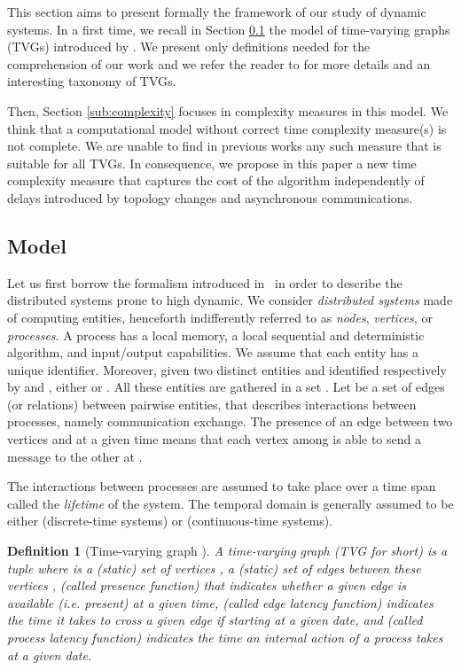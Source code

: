 \documentclass{article}
\newtheorem{definition}{Definition}
\begin{document}
This section aims to present formally the framework of our study of dynamic systems. In a first time, we recall in Section \ref{sub:model} the model of time-varying graphs (TVGs) introduced by \cite{CFQS12}. We present only definitions needed for the comprehension of our work and we refer the reader to \cite{CFQS12} for more details and an interesting taxonomy of TVGs. 

Then, Section \ref{sub:complexity} focuses in complexity measures in this model. We think that a computational model without correct time complexity measure(s) is not complete. We are unable to find in previous works any such measure that is suitable for all TVGs. In consequence, we propose in this paper a new time complexity measure that captures the cost of the algorithm independently of delays introduced by topology changes and asynchronous communications.

\subsection{Model}\label{sub:model}

Let us first borrow the formalism introduced in~\cite{CFQS12} in order to describe the distributed systems prone to high dynamic. We consider {\em distributed systems} made of  computing entities, henceforth indifferently referred to as {\em nodes}, {\em vertices}, or {\em processes}.  A process has a local memory, a local sequential and deterministic algorithm, and input\slash output capabilities. We assume that each entity has a unique identifier. Moreover, given two distinct entities  and  identified respectively by  and , either  or . All these entities are gathered in a set .  Let  be a set of edges (or relations) between pairwise entities, that describes interactions between processes, namely communication exchange. The presence of an edge between two vertices  and  at a given time  means that each vertex among  is able to send a message to the other at .

The interactions between processes are assumed to take place over a time span  called the {\em lifetime} of the system. The temporal domain  is generally assumed to be either  (discrete-time systems) or  (continuous-time systems).

\begin{definition}[Time-varying graph \cite{CFQS12}]
\label{def:TVG}
A time-varying graph (TVG for short)  is a tuple   where  is a (static) set of vertices ,  a (static) set of edges between these vertices ,  (called presence function) that indicates whether a given edge is available (\emph{i.e.} present) at a given time,  (called edge latency function) indicates the time it takes to cross a given edge if starting at a given date, and  (called process latency function) indicates the time an internal action of a process takes at a given date.
\end{definition}
\end{document}
